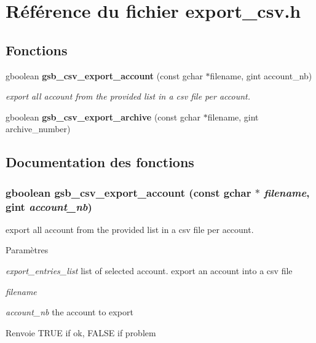 \section{Référence du fichier export\_\-csv.h}
\label{export__csv_8h}
\subsection*{Fonctions}
\begin{DoxyCompactItemize}
\item 
gboolean {\bf gsb\_\-csv\_\-export\_\-account} (const gchar $\ast$filename, gint account\_\-nb)
\begin{DoxyCompactList}\small\item\em export all account from the provided list in a csv file per account. \item\end{DoxyCompactList}\item 
gboolean {\bf gsb\_\-csv\_\-export\_\-archive} (const gchar $\ast$filename, gint archive\_\-number)
\end{DoxyCompactItemize}


\subsection{Documentation des fonctions}
\subsubsection[{gsb\_\-csv\_\-export\_\-account}]{\setlength{\rightskip}{0pt plus 5cm}gboolean gsb\_\-csv\_\-export\_\-account (const gchar $\ast$ {\em filename}, \/  gint {\em account\_\-nb})}\label{export__csv_8h_abdc7bb25c030ea9a260d4bf9f67e36c9}


export all account from the provided list in a csv file per account. 


\begin{DoxyParams}{Paramètres}
\item[{\em export\_\-entries\_\-list}]list of selected account. export an account into a csv file\item[{\em filename}]\item[{\em account\_\-nb}]the account to export\end{DoxyParams}
\begin{DoxyReturn}{Renvoie}
TRUE if ok, FALSE if problem 
\end{DoxyReturn}


